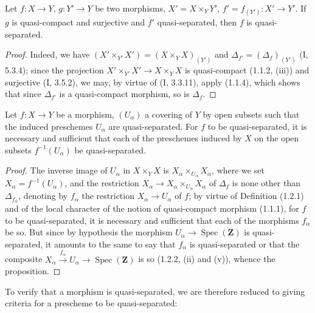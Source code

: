 \begin{proposition}[1.2.5]
\label{IV.1.2.5}
Let $f:X\to Y$, $g:Y'\to Y$ be two morphisms,
$X'=X\times_Y Y'$, $f'=f_{(Y')}:X'\to Y'$. If $g$ is quasi-compact and
surjective and $f'$ quasi-separated, then $f$ is quasi-separated.
\end{proposition}

\begin{proof}
Indeed, we have $(X'\times_{Y'}X')=(X\times_YX)_{(Y')}$ and
$\Delta_{f'}=(\Delta_f)_{(Y')}$ (I, 5.3.4); since the projection
$X'\times_{Y'}X'\to X\times_YX$ is quasi-compact (1.1.2, (iii)) and
surjective (I, 3.5.2), we may, by virtue of (I, 3.3.11), apply (1.1.4),
which shows that since $\Delta_{f'}$ is a quasi-compact morphism, so is
$\Delta_f$.
\end{proof}

\begin{proposition}[1.2.6]
\label{IV.1.2.6}
Let $f:X\to Y$ be a morphism, $(U_\alpha)$ a covering of $Y$ by open
subsets such that the induced preschemes $U_\alpha$ are quasi-separated. For
$f$ to be quasi-separated, it is necessary and sufficient that each of the
preschemes induced by $X$ on the open subsets $f^{-1}(U_\alpha)$ be
quasi-separated.
\end{proposition}

\begin{proof}
The inverse image of $U_\alpha$ in $X\times_YX$ is
$X_\alpha\times_{U_\alpha}X_\alpha$, where we set
$X_\alpha=f^{-1}(U_\alpha)$, and the restriction
$X_\alpha\to X_\alpha\times_{U_\alpha}X_\alpha$ of $\Delta_f$ is none other
than $\Delta_{f_\alpha}$, denoting by $f_\alpha$ the restriction
$X_\alpha\to U_\alpha$ of $f$; by virtue of Definition (1.2.1) and of the
local character of the notion of quasi-compact morphism (1.1.1), for $f$
to be quasi-separated, it is necessary and sufficient that each of the
morphisms $f_\alpha$ be so. But since by hypothesis the morphism
$U_\alpha\to\operatorname{Spec}(\mathbf Z)$ is quasi-separated, it amounts to
the same to say that $f_\alpha$ is quasi-separated or that the composite
$X_\alpha\xrightarrow{f_\alpha}U_\alpha\to\operatorname{Spec}(\mathbf Z)$
is so (1.2.2, (ii) and (v)), whence the proposition.
\end{proof}


To verify that a morphism is quasi-separated, we are therefore reduced to
giving criteria for a prescheme to be quasi-separated:

